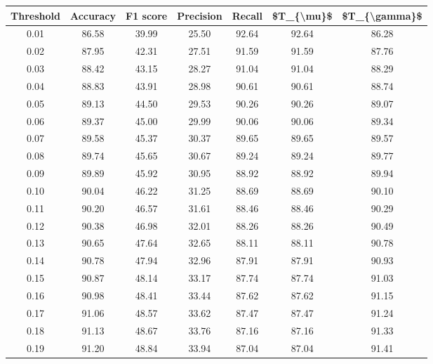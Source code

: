 \begin{tabular}{|c|c|c|c|c|c|c|}
\hline
 Threshold &  Accuracy &  F1 score &  Precision &  Recall &  \$T\_\{\textbackslash mu\}\$ &  \$T\_\{\textbackslash gamma\}\$ \\
\hline
      0.01 &     86.58 &     39.99 &      25.50 &   92.64 &      92.64 &         86.28 \\
      0.02 &     87.95 &     42.31 &      27.51 &   91.59 &      91.59 &         87.76 \\
      0.03 &     88.42 &     43.15 &      28.27 &   91.04 &      91.04 &         88.29 \\
      0.04 &     88.83 &     43.91 &      28.98 &   90.61 &      90.61 &         88.74 \\
      0.05 &     89.13 &     44.50 &      29.53 &   90.26 &      90.26 &         89.07 \\
      0.06 &     89.37 &     45.00 &      29.99 &   90.06 &      90.06 &         89.34 \\
      0.07 &     89.58 &     45.37 &      30.37 &   89.65 &      89.65 &         89.57 \\
      0.08 &     89.74 &     45.65 &      30.67 &   89.24 &      89.24 &         89.77 \\
      0.09 &     89.89 &     45.92 &      30.95 &   88.92 &      88.92 &         89.94 \\
      0.10 &     90.04 &     46.22 &      31.25 &   88.69 &      88.69 &         90.10 \\
      0.11 &     90.20 &     46.57 &      31.61 &   88.46 &      88.46 &         90.29 \\
      0.12 &     90.38 &     46.98 &      32.01 &   88.26 &      88.26 &         90.49 \\
      0.13 &     90.65 &     47.64 &      32.65 &   88.11 &      88.11 &         90.78 \\
      0.14 &     90.78 &     47.94 &      32.96 &   87.91 &      87.91 &         90.93 \\
      0.15 &     90.87 &     48.14 &      33.17 &   87.74 &      87.74 &         91.03 \\
      0.16 &     90.98 &     48.41 &      33.44 &   87.62 &      87.62 &         91.15 \\
      0.17 &     91.06 &     48.57 &      33.62 &   87.47 &      87.47 &         91.24 \\
      0.18 &     91.13 &     48.67 &      33.76 &   87.16 &      87.16 &         91.33 \\
      0.19 &     91.20 &     48.84 &      33.94 &   87.04 &      87.04 &         91.41 \\

\end{tabular}
